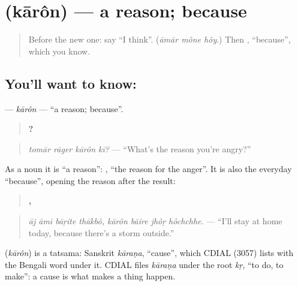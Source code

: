 \section[\texorpdfstring{\bn{কারণ} (kārôn)}{কারণ (kārôn)}]{ (kārôn) — a reason; because}

\label{lesson:BN-C268-karon}



\begin{quote}
Before the new one: say \textquotedblleft{}I think\textquotedblright{}. (\emph{āmār mône hôy}.) Then \textbf{}, \textquotedblleft{}because\textquotedblright{}, which you know.
\end{quote}

\subsection*{You'll want to know: }
\textbf{} — \emph{kārôn} — \textquotedblleft{}a reason; because\textquotedblright{}.

\begin{quote}
\textbf{   ?}
\end{quote}

\begin{quote}
\emph{tomār rāger kārôn kī?} — \textquotedblleft{}What's the reason you're angry?\textquotedblright{}
\end{quote}

As a noun it is \textquotedblleft{}a reason\textquotedblright{}: \textbf{ }, \textquotedblleft{}the reason for the anger\textquotedblright{}. It is also the everyday \textquotedblleft{}because\textquotedblright{}, opening the reason after the result:

\begin{quote}
\textbf{   ,    }
\end{quote}

\begin{quote}
\emph{āj āmi bāṛite thākbô, kārôn bāire jhôṛ hôchchhe.} — \textquotedblleft{}I'll stay at home today, because there's a storm outside.\textquotedblright{}
\end{quote}

\begin{cousinweb}
\textbf{} (\emph{kārôn}) is a tatsama: Sanskrit \emph{kāraṇa}, \textquotedblleft{}cause\textquotedblright{}, which CDIAL (3057) lists with the Bengali word under it. CDIAL files \emph{kāraṇa} under the root \emph{kṛ}, \textquotedblleft{}to do, to make\textquotedblright{}: a cause is what makes a thing happen.
\end{cousinweb}

